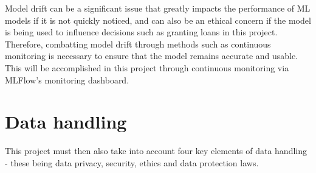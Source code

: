 \documentclass[12pt]{report}
\newcommand{\para}{\vspace{7pt}\noindent}
\begin{document}
\para Model drift can be a significant issue that greatly impacts the performance of ML models if it is not quickly noticed, and can 
also be an ethical concern if the model is being used to influence decisions such as granting loans in this project. 
Therefore, combatting model drift through methods such as continuous monitoring is necessary to ensure that the model remains accurate 
and usable. This will be accomplished in this project through continuous monitoring via MLFlow's monitoring dashboard.

\section{Data handling}\label{sec:DataHandling}
This project must then also take into account four key elements of data handling - these being data privacy, security, 
ethics and data protection laws. 
\end{document}
